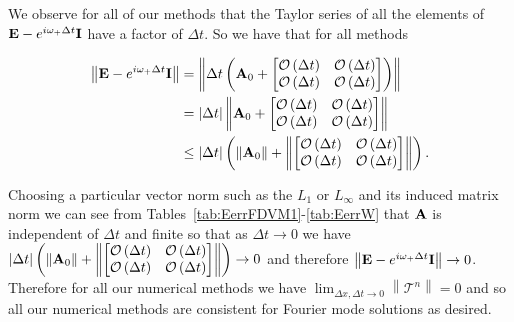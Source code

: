 We observe for all of our methods that the Taylor series of all the elements of $\mathbf{E} -  e^{i \omega_+ \Delta t}\mathbf{I}$ have a factor of $\Delta t$. So we have that for all methods 

\begin{align*}
\left \| \mathbf{E} -  e^{i \omega_+ \Delta t}\mathbf{I} \right \| &=  \left \| \Delta t \left(\mathbf{A}_0 +  \begin{bmatrix}
\mathcal{O}\left(\Delta t\right) & \mathcal{O}\left(\Delta t\right)  \\ \mathcal{O}\left(\Delta t\right)&\mathcal{O}\left(\Delta t\right)
\end{bmatrix}\right)\right \|  \nonumber\\ &= |\Delta t|  \left \| \mathbf{A}_0 +  \begin{bmatrix}
\mathcal{O}\left(\Delta t\right) & \mathcal{O}\left(\Delta t\right)  \\ \mathcal{O}\left(\Delta t\right)&\mathcal{O}\left(\Delta t\right)
\end{bmatrix}\right \|
 \nonumber\\ &\le  |\Delta t| \left(\left \| \mathbf{A}_0 \right \| + \left \| \begin{bmatrix}
\mathcal{O}\left(\Delta t\right) & \mathcal{O}\left(\Delta t\right)  \\ \mathcal{O}\left(\Delta t\right)&\mathcal{O}\left(\Delta t\right)
\end{bmatrix}\right \|\right).
\end{align*} 

Choosing a particular vector norm such as the $L_1$ or $L_\infty$ and its induced matrix norm we can see from Tables~\ref{tab:EerrFDVM1}-\ref{tab:EerrW} that $\mathbf{A}$ is independent of $\Delta t$ and finite so that as $\Delta t \rightarrow 0$ we have $|\Delta t| \left(\left \| \mathbf{A}_0 \right \| + \left \| \begin{bmatrix}
\mathcal{O}\left(\Delta t\right) & \mathcal{O}\left(\Delta t\right)  \\ \mathcal{O}\left(\Delta t\right)&\mathcal{O}\left(\Delta t\right)
\end{bmatrix}\right \|\right)  \rightarrow 0$  and therefore  $\left \| \mathbf{E} -  e^{i \omega_+ \Delta t}\mathbf{I} \right \| \rightarrow 0$. Therefore for all our numerical methods we have $ \lim_{\Delta x,\Delta t \rightarrow 0}\left \| \mathcal{T}^n \right \| = 0 $ and so all our numerical methods are consistent for Fourier mode solutions as desired. 

